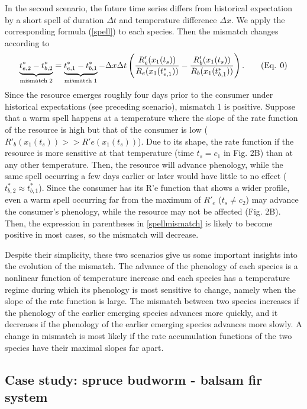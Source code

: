\documentclass[12 pt]{article}
\begin{document}
In the second scenario, the future time series differs from historical expectation by a short spell of duration $\Delta t$ and temperature difference $\Delta x$. We apply the corresponding formula (\ref{spell}) to each species. Then the mismatch changes according to
\begin{equation}\label{spellmismatch}
    \underbrace{t_{e,2}^* - t_{b,2}^*}_{{\rm mismatch\; 2}} = \underbrace{t_{e,1}^* - t_{b,1}^*}_{{\rm mismatch\; 1}}-\Delta x\Delta t\left(\frac{R_e'(x_1(t_s))}{R_e(x_1(t_{e,1}^*))} - \frac{R_b'(x_1(t_s))}{R_b(x_1(t_{b,1}^*))}\right). \tag{Eq. \theequation}
\end{equation}
Since the resource emerges roughly four days prior to the consumer under historical expectations (see preceding scenario), mismatch 1 is positive. Suppose that a warm spell happens at a temperature where the slope of the rate function of the resource is high but that of the consumer is low ($R'_b(x_1(t_s))>>R'e(x_1(t_s))$). Due to its shape, the rate function if the resource is more sensitive at that temperature (time $t_s = c_1$ in Fig. 2B) than at any other temperature. Then, the resource will advance phenology, while the same spell occurring a few days earlier or later would have little to no effect ($t_{b,2}^* \approx t_{b,1}^*$). Since the consumer has its R’e function that shows a wider profile, even a warm spell occurring far from the maximum of $R'_e$ ($t_s \neq c_2$) may advance the consumer’s phenology, while the resource may not be affected (Fig. 2B). Then, the expression in parentheses in \ref{spellmismatch} is likely to become positive in most cases, so the mismatch will decrease.\par
Despite their simplicity, these two scenarios give us some important insights into the evolution of the mismatch. The advance of the phenology of each species is a nonlinear function of temperature increase and each species has a temperature regime during which its phenology is most sensitive to change, namely when the slope of the rate function is large. The mismatch between two species increases if the phenology of the earlier emerging species advances more quickly, and it decreases if the phenology of the earlier emerging species advances more slowly. A change in mismatch is most likely if the rate accumulation functions of the two species have their maximal slopes far apart.\par

\subsection{Case study: spruce budworm - balsam fir system}\label{resultscasestudy}
\end{document}
